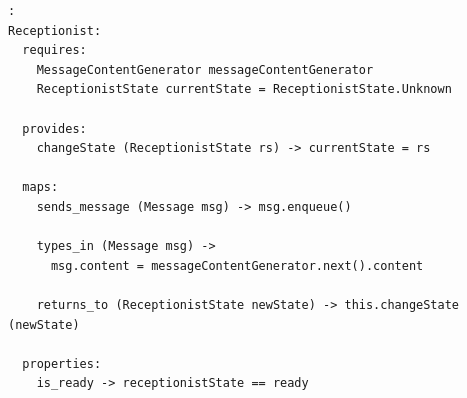 \begin{lstlisting}[caption=Example language for mapping concepts,label={lst:mapping_language_concept}]:
Receptionist:
  requires:
    MessageContentGenerator messageContentGenerator
    ReceptionistState currentState = ReceptionistState.Unknown
  
  provides:
    changeState (ReceptionistState rs) -> currentState = rs
  
  maps:
    sends_message (Message msg) -> msg.enqueue()

    types_in (Message msg) -> 
      msg.content = messageContentGenerator.next().content
    
    returns_to (ReceptionistState newState) -> this.changeState (newState)

  properties:
    is_ready -> receptionistState == ready
\end{lstlisting}

